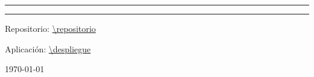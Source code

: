 \begin{titlepage}
  \centering
  \vspace*{2cm}
  {\Large \asignatura\par}
  \vspace{0.5cm}
  {\large \curso\par}
  \vspace{3cm}
  {\color{rojiblanco}\rule{\linewidth}{1.5pt}\par}
  \vspace{0.6cm}
  {\Huge\bfseries \titulo\par}
  \vspace{0.4cm}
  {\Large \subtitulo\par}
  \vspace{0.6cm}
  {\color{rojiblanco}\rule{\linewidth}{1.5pt}\par}
  \vspace{3cm}
  {\Large \autor\par}
  \vfill
  {\small Repositorio: \url{\repositorio}\par}
  {\small Aplicación: \url{\despliegue}\par}
  \vspace{0.5cm}
  {\small \today\par}
\end{titlepage}
